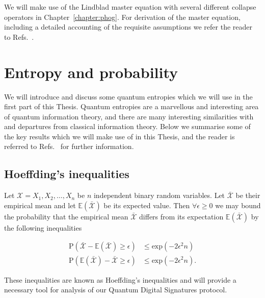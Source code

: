 We will make use of the Lindblad master equation with several different collapse operators in Chapter~\ref{chapter:phog}. For derivation of the master equation, including a detailed accounting of the requisite assumptions we refer the reader to Refs.~\cite{Breuer2002, Carmichael1999}.



\FloatBarrier
\section{Entropy and probability}
We will introduce and discuss some quantum entropies which we will use in the first part of this Thesis. Quantum entropies are a marvellous and interesting area of quantum information theory, and there are many interesting similarities with and departures from classical information theory. Below we summarise some of the key results which we will make use of in this Thesis, and the reader is referred to Refs.~\cite{Nielsen2010, Tomamichel2016, Wilde2015, Watrous2019} for further information.

\FloatBarrier
\subsection{Hoeffding's inequalities}
Let $\mathcal{X} = X_1, X_2, \dots, X_n$ be $n$ independent binary random variables. Let $\bar{\mathcal{X}}$ be their empirical mean  and let $\mathbb{E}\left(\bar{\mathcal{X}}\right)$ be its expected value. Then $\forall \epsilon \ge 0$ we may bound the probability that the empirical mean $\bar{\mathcal{X}}$ differs from its expectation $\mathbb{E}\left(\bar{\mathcal{X}}\right)$ by the following inequalities

\begin{align}
\label{eqn:hoeffding1}
\text{P}\left(\bar{\mathcal{X}} - \mathbb{E}\left(\bar{\mathcal{X}}\right) \ge \epsilon\right) &\le \text{exp}\left(- 2 \epsilon^2 n\right) \\
\label{eqn:hoeffding2}
\text{P}\left(\mathbb{E}\left(\bar{\mathcal{X}}\right) - \bar{\mathcal{X}} \ge \epsilon\right) &\le \text{exp}\left(- 2 \epsilon^2 n\right).
\end{align}





\noindent These inequalities are known as Hoeffding's inequalities \cite{Hoeffding1963} and will provide a necessary tool for analysis of our Quantum Digital Signatures protocol.



